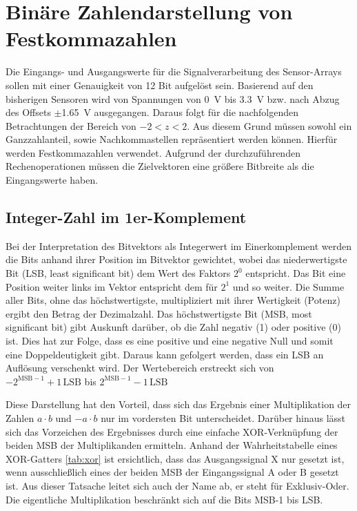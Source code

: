\section{Binäre Zahlendarstellung von Festkommazahlen}

Die Eingangs- und Ausgangswerte für die Signalverarbeitung des Sensor-Arrays sollen mit einer Genauigkeit von 12 Bit aufgelöst sein.
Basierend auf den bisherigen Sensoren wird von Spannungen von \SI{0}{V} bis \SI{3,3}{V} bzw. nach Abzug des Offsets $\pm$\SI{1,65}{V} 
ausgegangen. Daraus folgt für die nachfolgenden Betrachtungen der Bereich von $-2 < z < 2$.
Aus diesem Grund müssen sowohl ein Ganzzahlanteil, sowie Nachkommastellen repräsentiert werden können. 
Hierfür werden Festkommazahlen verwendet. Aufgrund der durchzuführenden Rechenoperationen müssen die Zielvektoren eine größere
Bitbreite als die Eingangswerte haben.


\subsection{Integer-Zahl im 1er-Komplement}
Bei der Interpretation des Bitvektors als Integerwert im Einerkomplement werden die Bits anhand ihrer Position im Bitvektor gewichtet, wobei das niederwertigste Bit 
(LSB, least significant bit) dem Wert des Faktors $2^0$ entspricht. Das Bit eine Position weiter links im Vektor entspricht dem für $2^1$ und so weiter. Die Summe aller Bits, ohne das höchstwertigste, 
multipliziert mit ihrer Wertigkeit (Potenz) ergibt den Betrag der Dezimalzahl. Das höchstwertigste Bit (MSB, most significant bit) gibt Auskunft darüber, ob die 
Zahl negativ (1) oder positive (0) ist. 
Dies hat zur Folge, dass es eine positive und eine negative Null und somit eine Doppeldeutigkeit gibt. Daraus kann gefolgert werden, dass ein
LSB an Auflösung verschenkt wird. Der Wertebereich erstreckt sich von $-2^{\mathrm{MSB}-1}+1\,\mathrm{LSB}$ bis $2^{\mathrm{MSB}-1}-1\,\mathrm{LSB}$

Diese Darstellung hat den Vorteil, dass sich das Ergebnis einer Multiplikation der Zahlen $a \cdot b$ und $-a \cdot b$ nur im vordersten Bit unterscheidet. Darüber hinaus
lässt sich das Vorzeichen des Ergebnisses durch eine einfache XOR-Verknüpfung der beiden MSB der Multiplikanden ermitteln. Anhand der Wahrheitstabelle eines XOR-Gatters
\ref{tab:xor} ist ersichtlich, dass das Ausgangssignal X nur gesetzt ist, wenn ausschließlich eines der beiden MSB der Eingangssignal A oder B gesetzt ist. 
Aus dieser Tatsache leitet sich auch der Name ab, er steht für Exklusiv-Oder. Die eigentliche Multiplikation beschränkt sich auf die Bits MSB-1 bis LSB.

